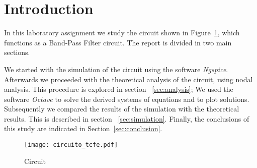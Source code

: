 \section{Introduction}
\label{sec:introduction}

\par In this laboratory assignment we study the circuit 
shown in Figure~\ref{fig:circuit}, which functions as a Band-Pass Filter 
circuit. The report is divided in two main sections.

We started with the simulation of the circuit using the software 
\textit{Ngspice}. 
Afterwards we proceeded with the theoretical analysis of the circuit, 
using nodal analysis. 
This procedure is explored in section ~\ref{sec:analysis};
We used the software \textit{Octave} to solve the derived systems 
of equations and to plot solutions.
Subsequently we compared the results of the simulation with the 
theoretical results. This is described in section ~\ref{sec:simulation}.
Finally, the conclusions of this study are indicated in
Section~\ref{sec:conclusion}.

\begin{figure}[ht] \centering
    \texttt{[image: circuito\_tcfe.pdf]}
    \caption{Circuit}
    \label{fig:circuit}
\end{figure}

